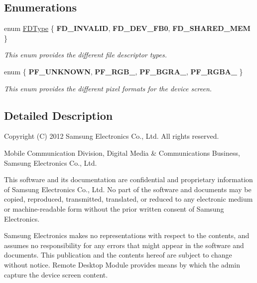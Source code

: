 \subsection*{\-Enumerations}
\begin{DoxyCompactItemize}
\item 
enum \hyperlink{namespaceandroid_a40f45e8c93a87251c417d8cefdd60fe2}{\-F\-D\-Type} \{ {\bfseries \-F\-D\-\_\-\-I\-N\-V\-A\-L\-I\-D}, 
{\bfseries \-F\-D\-\_\-\-D\-E\-V\-\_\-\-F\-B0}, 
{\bfseries \-F\-D\-\_\-\-S\-H\-A\-R\-E\-D\-\_\-\-M\-E\-M}
 \}
\begin{DoxyCompactList}\small\item\em \-This enum provides the different file descriptor types. \end{DoxyCompactList}\item 
enum \{ {\bfseries \-P\-F\-\_\-\-U\-N\-K\-N\-O\-W\-N}, 
{\bfseries \-P\-F\-\_\-\-R\-G\-B\-\_}, 
{\bfseries \-P\-F\-\_\-\-B\-G\-R\-A\-\_}, 
{\bfseries \-P\-F\-\_\-\-R\-G\-B\-A\-\_}
 \}
\begin{DoxyCompactList}\small\item\em \-This enum provides the different pixel formats for the device screen. \end{DoxyCompactList}\end{DoxyCompactItemize}


\subsection{\-Detailed \-Description}
\-Copyright (\-C) 2012 \-Samsung \-Electronics \-Co., \-Ltd. \-All rights reserved.

\-Mobile \-Communication \-Division, \-Digital \-Media \& \-Communications \-Business, \-Samsung \-Electronics \-Co., \-Ltd.

\-This software and its documentation are confidential and proprietary information of \-Samsung \-Electronics \-Co., \-Ltd. \-No part of the software and documents may be copied, reproduced, transmitted, translated, or reduced to any electronic medium or machine-\/readable form without the prior written consent of \-Samsung \-Electronics.

\-Samsung \-Electronics makes no representations with respect to the contents, and assumes no responsibility for any errors that might appear in the software and documents. \-This publication and the contents hereof are subject to change without notice. \-Remote \-Desktop \-Module provides means by which the admin capture the device screen content. 

